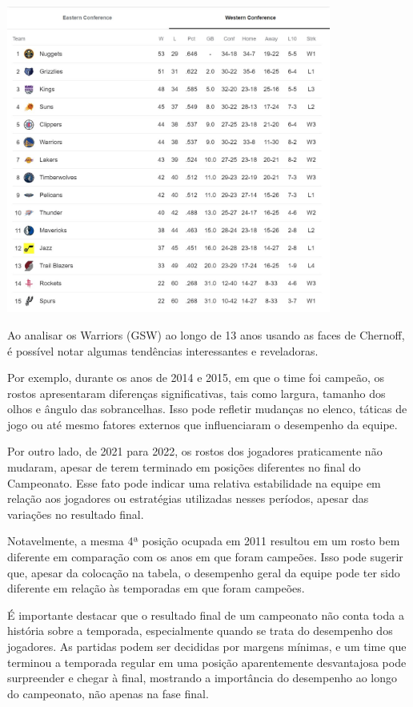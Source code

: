 \documentclass[
]{book}
\begin{document}
\includegraphics[width=0.8\textwidth,height=\textheight]{imagens/22.jpeg}

Ao analisar os Warriors (GSW) ao longo de 13 anos usando as faces de Chernoff, é possível notar algumas tendências interessantes e reveladoras.

Por exemplo, durante os anos de 2014 e 2015, em que o time foi campeão, os rostos apresentaram diferenças significativas, tais como largura, tamanho dos olhos e ângulo das sobrancelhas. Isso pode refletir mudanças no elenco, táticas de jogo ou até mesmo fatores externos que influenciaram o desempenho da equipe.

Por outro lado, de 2021 para 2022, os rostos dos jogadores praticamente não mudaram, apesar de terem terminado em posições diferentes no final do Campeonato. Esse fato pode indicar uma relativa estabilidade na equipe em relação aos jogadores ou estratégias utilizadas nesses períodos, apesar das variações no resultado final.

Notavelmente, a mesma 4ª posição ocupada em 2011 resultou em um rosto bem diferente em comparação com os anos em que foram campeões. Isso pode sugerir que, apesar da colocação na tabela, o desempenho geral da equipe pode ter sido diferente em relação às temporadas em que foram campeões.

É importante destacar que o resultado final de um campeonato não conta toda a história sobre a temporada, especialmente quando se trata do desempenho dos jogadores. As partidas podem ser decididas por margens mínimas, e um time que terminou a temporada regular em uma posição aparentemente desvantajosa pode surpreender e chegar à final, mostrando a importância do desempenho ao longo do campeonato, não apenas na fase final.
\end{document}
